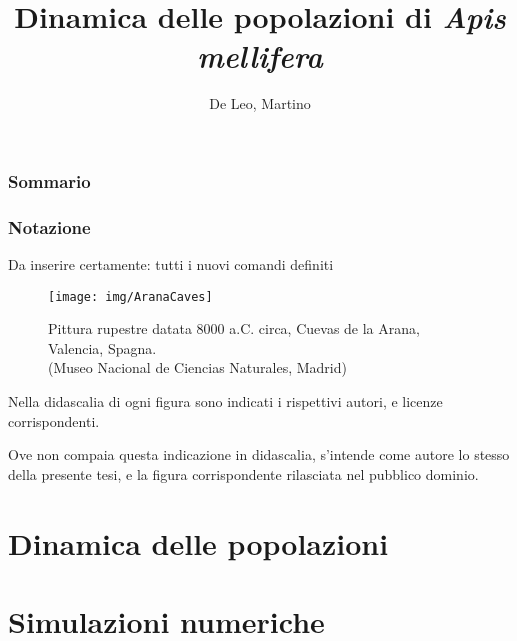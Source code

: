 \documentclass[12pt,a4paper,oneside,hidelinks]{book} %
\author{De Leo, Martino}
\title{Dinamica delle popolazioni di \emph{Apis mellifera} }
\begin{document}
\maketitle %

\frontmatter

\section*{Sommario}


\section*{Notazione}
Da inserire certamente: tutti i nuovi comandi definiti

\begin{figure}[hbp]
    \centering
    \texttt{[image: img/AranaCaves]}

    \caption[Pittura rupestre di Arana.]{Pittura rupestre datata 8000 a.C. circa, Cuevas de la Arana, Valencia, Spagna. \\ (Museo Nacional de Ciencias Naturales, Madrid)}
    \label{img:arana}
\end{figure}

\cleardoublepage

\tableofcontents
\listoffigures
Nella didascalia di ogni figura sono indicati i rispettivi autori, e licenze corrispondenti.

Ove non compaia questa indicazione in didascalia, s'intende come autore lo stesso della presente tesi, e la figura
corrispondente rilasciata nel pubblico dominio.

\listoftables


\mainmatter

\clearpage
\part{Dinamica delle popolazioni}







\part{Simulazioni numeriche}







\appendix



\backmatter



\cleardoublepage
{}
\nocite{*} %
\printbibliography
\end{document}

